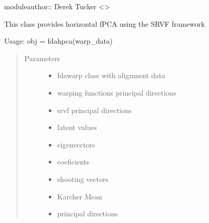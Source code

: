 \documentclass[letterpaper,10pt,english]{sphinxmanual}
\begin{document}
moduleauthor:: Derek Tucker \textless{}\textgreater{}

\begin{fulllineitems}
\label{\detokenize{fPCA:fPCA.fdahpca}}
This class provides horizontal fPCA using the
SRVF framework

Usage:  obj = fdahpca(warp\_data)
\begin{quote}\begin{description}
\item[{Parameters}] \leavevmode\begin{itemize}
\item {} 
 \textendash{} fdawarp class with alignment data

\item {} 
 \textendash{} warping functions principal directions

\item {} 
 \textendash{} srvf principal directions

\item {} 
 \textendash{} latent values

\item {} 
 \textendash{} eigenvectors

\item {} 
 \textendash{} coeficients

\item {} 
 \textendash{} shooting vectors

\item {} 
 \textendash{} Karcher Mean

\item {} 
 \textendash{} principal directions

\end{itemize}

\end{description}\end{quote}


\end{fulllineitems}
\end{document}
